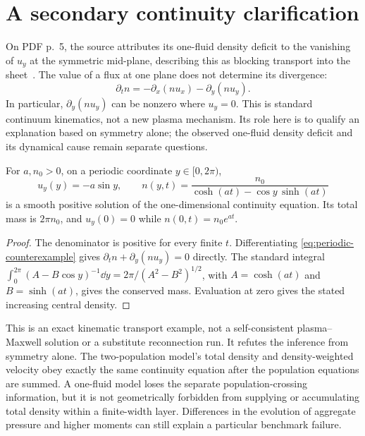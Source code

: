 \section{A secondary continuity clarification}
\label{sec:continuity}
On PDF p.~5, the source attributes its one-fluid density deficit to the
vanishing of $u_y$ at the symmetric mid-plane, describing this as blocking
transport into the sheet~\cite{original}. The value of a flux at one plane
does not determine its divergence:
\begin{equation}
 \partial_t n=-\partial_x(nu_x)-\partial_y(nu_y).
 \label{eq:continuity-law}
\end{equation}
In particular, $\partial_y(nu_y)$ can be nonzero where $u_y=0$.
This is standard continuum kinematics, not a new plasma mechanism. Its role
here is to qualify an explanation based on symmetry alone; the observed
one-fluid density deficit and its dynamical cause remain separate questions.

\begin{proposition}
\label{prop:stagnation-density}
For $a,n_0>0$, on a periodic coordinate $y\in[0,2\pi)$,
\begin{equation}
 u_y(y)=-a\sin y,\qquad
 n(y,t)=\frac{n_0}{\cosh(at)-\cos y\,\sinh(at)}
 \label{eq:periodic-counterexample}
\end{equation}
is a smooth positive solution of the one-dimensional continuity equation.
Its total mass is $2\pi n_0$, and
$u_y(0)=0$ while $n(0,t)=n_0e^{at}$.
\end{proposition}
\begin{proof}
The denominator is positive for every finite $t$.
Differentiating \eqref{eq:periodic-counterexample} gives
$\partial_tn+\partial_y(nu_y)=0$ directly. The standard integral
$\int_0^{2\pi}(A-B\cos y)^{-1}\dd y=2\pi/(A^2-B^2)^{1/2}$,
with $A=\cosh(at)$ and $B=\sinh(at)$, gives the conserved mass.
Evaluation at zero gives the stated increasing central density.
\end{proof}

This is an exact kinematic transport example, not a self-consistent
plasma--Maxwell solution or a substitute reconnection run. It refutes the
inference from symmetry alone. The two-population model's total density and
density-weighted velocity obey exactly the same continuity equation after
the population equations are summed. A one-fluid model loses the separate
population-crossing information, but it is not geometrically forbidden from
supplying or accumulating total density within a finite-width layer.
Differences in the evolution of aggregate pressure and higher moments can
still explain a particular benchmark failure.
